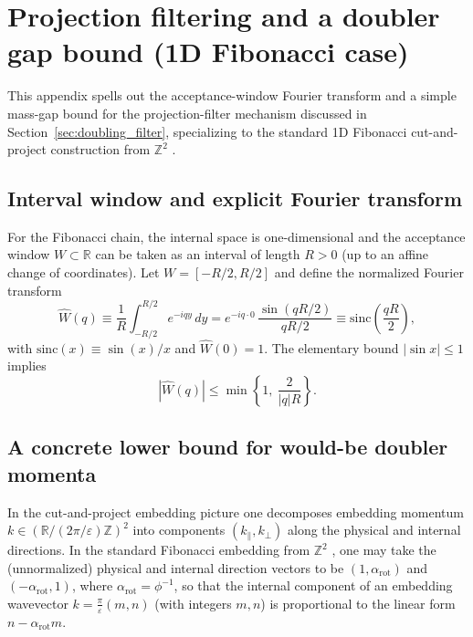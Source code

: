 \section{Projection filtering and a doubler gap bound (1D Fibonacci case)}
\label{app:doubling_filter}
This appendix spells out the acceptance-window Fourier transform and a simple mass-gap bound for the projection-filter mechanism discussed in Section~\ref{sec:doubling_filter}, specializing to the standard 1D Fibonacci cut-and-project construction from $\mathbb{Z}^2$ \cite{Senechal1995,BaakeGrimm2013AperiodicOrder}.\par

\subsection{Interval window and explicit Fourier transform}
For the Fibonacci chain, the internal space is one-dimensional and the acceptance window $W\subset\mathbb{R}$ can be taken as an interval of length $R>0$ (up to an affine change of coordinates). Let $W=[-R/2,R/2]$ and define the normalized Fourier transform
\begin{equation}
    \widehat{W}(q)\equiv \frac{1}{R}\int_{-R/2}^{R/2} e^{-iqy}\,dy
    = e^{-iq\cdot 0}\,\frac{\sin(qR/2)}{qR/2}
    \equiv \mathrm{sinc}\!\left(\frac{qR}{2}\right),
\end{equation}
with $\mathrm{sinc}(x)\equiv \sin(x)/x$ and $\widehat{W}(0)=1$.
The elementary bound $|\sin x|\le 1$ implies
\begin{equation}
    |\widehat{W}(q)| \le \min\left\{1,\ \frac{2}{|q|R}\right\}.
\label{eq:window_sinc_bound}
\end{equation}

\subsection{A concrete lower bound for would-be doubler momenta}
In the cut-and-project embedding picture one decomposes embedding momentum $k\in(\mathbb{R}/(2\pi/\varepsilon)\mathbb{Z})^2$ into components $(k_\parallel,k_\perp)$ along the physical and internal directions. In the standard Fibonacci embedding from $\mathbb{Z}^2$ \cite{Senechal1995,BaakeGrimm2013AperiodicOrder}, one may take the (unnormalized) physical and internal direction vectors to be $(1,\alpha_{\mathrm{rot}})$ and $(-\alpha_{\mathrm{rot}},1)$, where $\alpha_{\mathrm{rot}}=\phi^{-1}$, so that the internal component of an embedding wavevector $k=\frac{\pi}{\varepsilon}(m,n)$ (with integers $m,n$) is proportional to the linear form $n-\alpha_{\mathrm{rot}}m$.

